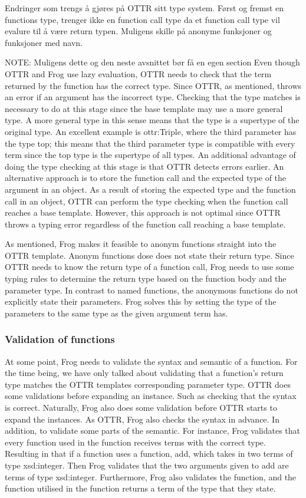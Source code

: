 \para
Endringer som trengs å gjøres på OTTR sitt type system. Først og fremst en functions type, trenger ikke en function call type da et function call type vil evalure til å være return typen. Muligens skille på anonyme funksjoner og funksjoner med navn.

\para
NOTE: Muligens dette og den neste avsnittet bør få en egen section
Even though OTTR and Frog use lazy evaluation, OTTR needs to check that the term returned by the function has the correct type. Since OTTR, as mentioned, throws an error if an argument has the incorrect type. Checking that the type matches is necessary to do at this stage since the base template may use a more general type. A more general type in this sense means that the type is a supertype of the original type. An excellent example is ottr:Triple, where the third parameter has the type top; this means that the third parameter type is compatible with every term since the top type is the supertype of all types. An additional advantage of doing the type checking at this stage is that OTTR detects errors earlier. An alternative approach is to store the function call and the expected type of the argument in an object. As a result of storing the expected type and the function call in an object, OTTR can perform the type checking when the function call reaches a base template. However, this approach is not optimal since OTTR throws a typing error regardless of the function call reaching a base template. 

\para 
As mentioned, Frog makes it feasible to anonym functions straight into the OTTR template. Anonym functions dose does not state their return type. Since OTTR needs to know the return type of a function call, Frog needs to use some typing rules to determine the return type based on the function body and the parameter type. In contrast to named functions, the anonymous functions do not explicitly state their parameters. Frog solves this by setting the type of the parameters to the same type as the given argument term has. 

\subsubsection{Validation of functions}
At some point, Frog needs to validate the syntax and semantic of a function. For the time being, we have only talked about validating that a function's return type matches the OTTR templates corresponding parameter type.  OTTR does some validations before expanding an instance. Such as checking that the syntax is correct. Naturally, Frog also does some validation before OTTR starts to expand the instances. As OTTR, Frog also checks the syntax in advance. In addition, to validate some parts of the semantic. For instance, Frog validates that every function used in the function receives terms with the correct type. Resulting in that if a function uses a function, add, which takes in two terms of type xsd:integer. Then Frog validates that the two arguments given to add are terms of type xsd:integer. Furthermore, Frog also validates the function, and the function utilised in the function returns a term of the type that they state.

